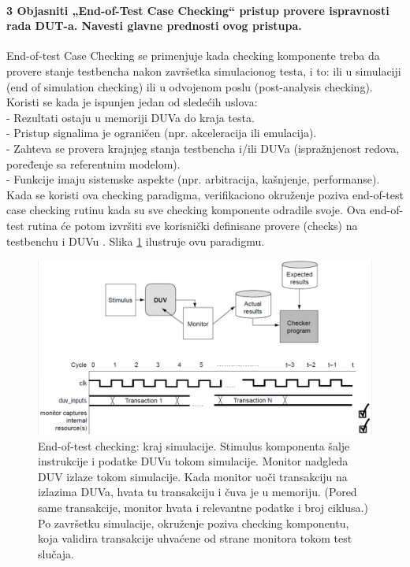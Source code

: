 \documentclass[a4paper, 12pt]{article}
\begin{document}
\paragraph{3 Objasniti „End-of-Test Case Checking“ pristup provere ispravnosti rada DUT-a. Navesti glavne prednosti ovog pristupa.}
\hfill \break
\indent End-of-test Case Checking se primenjuje kada checking komponente treba da provere stanje testbencha nakon završetka simulacionog testa, i to: ili u simulaciji (end of simulation checking) ili u odvojenom poslu (post-analysis checking). Koristi se kada je ispunjen jedan od sledećih uslova: \\
- Rezultati ostaju u memoriji DUVa do kraja testa.\\
- Pristup signalima je ograničen (npr. akceleracija ili emulacija).\\
- Zahteva se provera krajnjeg stanja testbencha i/ili DUVa (ispražnjenost redova, poređenje sa referentnim modelom).\\
- Funkcije imaju sistemske aspekte (npr. arbitracija, kašnjenje, performanse).\\
\indent 
Kada se koristi ova checking paradigma, verifikaciono okruženje poziva end-of-test case checking rutinu kada su sve checking komponente odradile svoje. Ova end-of-test rutina će potom izvršiti sve korisnički definisane provere (checks) na testbenchu i DUVu . Slika \ref{img2} ilustruje ovu paradigmu.
\begin{figure}[h!]
\centering
\includegraphics[scale=0.45]{img2.png}
\caption{End-of-test checking: kraj simulacije. Stimulus komponenta šalje instrukcije i podatke DUVu tokom simulacije. Monitor nadgleda DUV izlaze tokom simulacije. Kada monitor uoči transakciju na izlazima DUVa, hvata tu transakciju i čuva je u memoriju. (Pored same transakcije, monitor hvata i relevantne podatke i broj ciklusa.) Po završetku simulacije, okruženje poziva checking komponentu, koja validira transakcije uhvaćene od strane monitora tokom test slučaja.}
\label{img2}
\end{figure} 
\end{document}
